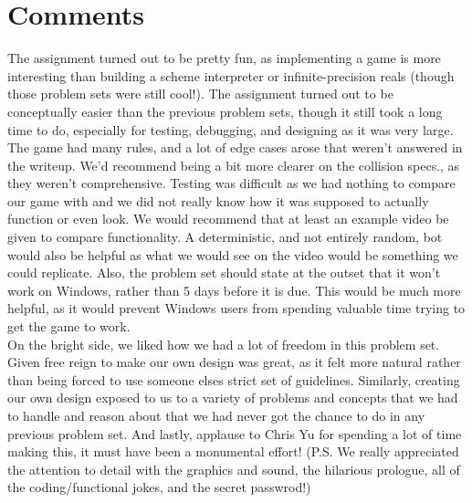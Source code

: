 \documentclass{article}
\begin{document}
\section{Comments}
The assignment turned out to be pretty fun, as implementing a game is more interesting than building a scheme interpreter or infinite-precision reals (though those problem sets were still cool!). The assignment turned out to be conceptually easier than the previous problem sets, though it still took a long time to do, especially for testing, debugging, and designing as it was very large. \\

The game had many rules, and a lot of edge cases arose that weren't answered in the writeup. We'd recommend being a bit more clearer on the collision specs., as they weren't comprehensive. Testing was difficult as we had nothing to compare our game with and we did not really know how it was supposed to actually function or even look. We would recommend that at least an example video be given to compare functionality. A deterministic, and not entirely random, bot would also be helpful as what we would see on the video would be something we could replicate. Also, the problem set should state at the outset that it won't work on Windows, rather than 5 days before it is due. This would be much more helpful, as it would prevent Windows users from spending valuable time trying to get the game to work. \\

On the bright side, we liked how we had a lot of freedom in this problem set. Given free reign to make our own design was great, as it felt more natural rather than being forced to use someone elses strict set of guidelines. Similarly, creating our own design exposed to us to a variety of problems and concepts that we had to handle and reason about that we had never got the chance to do in any previous problem set. And lastly, applause to Chris Yu for spending a lot of time making this, it must have been a monumental effort! (P.S. We really appreciated the attention to detail with the graphics and sound, the hilarious prologue, all of the coding/functional jokes, and the secret passwrod!)
\end{document}
